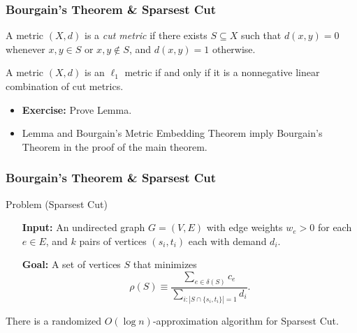 \documentclass{beamer}
\begin{document}
    \begin{frame}
        \frametitle{Bourgain's Theorem \& {\sc Sparsest Cut}}
    
        \begin{definition}
            A metric $(X, d)$ is a \emph{cut metric} if there exists $S \subseteq X$ such that $d(x, y) = 0$ whenever $x, y \in S$ or $x, y \not \in S$, and $d(x, y) = 1$ otherwise.
        \end{definition}

        \pause

        \begin{lemma}
            A metric $(X, d)$ is an $\ell_1$ metric if and only if it is a nonnegative linear combination of cut metrics.
        \end{lemma}

        \pause

        \begin{itemize}
            \item {\bf Exercise:} Prove Lemma. \pause
            \item Lemma and Bourgain's Metric Embedding Theorem imply Bourgain's Theorem in the proof of the main theorem.
        \end{itemize}
    \end{frame}

    \begin{frame}
        \frametitle{Bourgain's Theorem \& {\sc Sparsest Cut}}

        \begin{block}{Problem ({\sc Sparsest Cut})}
            \setlength{\leftmargini}{3.25em}
            \begin{itemize}
                \item[\bf Input:] An undirected graph $G = (V, E)$ with edge weights $w_e > 0$ for each $e \in E$, and $k$ pairs of vertices $(s_i, t_i)$ each with demand $d_i$.
                \item[\bf Goal:] A set of vertices $S$ that minimizes
                $$ \rho(S) \equiv \frac{\sum_{e \in \delta(S)} c_e}{\sum_{i : |S \cap \{ s_i, t_i \}| = 1} d_i}. $$
            \end{itemize}
        \end{block}

        \pause

        \begin{corollary}
            There is a randomized $O(\log n)$-approximation algorithm for {\sc Sparsest Cut}.
        \end{corollary}
    \end{frame}
\end{document}
